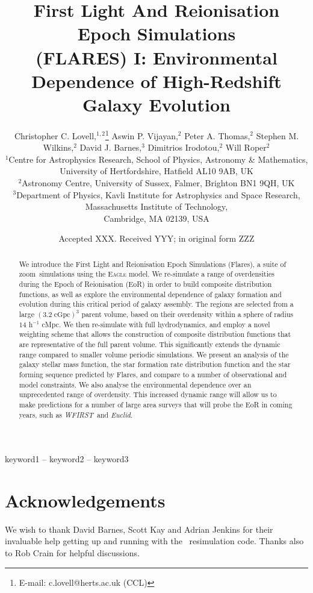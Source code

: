 \documentclass[fleqn,usenatbib]{mnras}
\title[FLARES I]{First Light And Reionisation Epoch Simulations \\(FLARES) I: Environmental Dependence of High-Redshift Galaxy Evolution}
\author[C. C. Lovell et al.]{Christopher C. Lovell,$^{1,2}$\thanks{E-mail: c.lovell@herts.ac.uk (CCL)}
Aswin P. Vijayan,$^{2}$
Peter A. Thomas,$^{2}$
\newauthor
Stephen M. Wilkins,$^{2}$
David J. Barnes,$^{3}$
Dimitrios Irodotou,$^{2}$
Will Roper$^{2}$
\\
$^{1}$Centre for Astrophysics Research, School of Physics, Astronomy \& Mathematics, \\University of Hertfordshire, Hatfield AL10 9AB, UK\\
$^{2}$Astronomy Centre, University of Sussex, Falmer, Brighton BN1 9QH, UK\\
$^{3}$Department of Physics, Kavli Institute for Astrophysics and Space Research, Massachusetts Institute of Technology,\\Cambridge, MA 02139, USA
}
\date{Accepted XXX. Received YYY; in original form ZZZ}
\newcommand{\eagle}{\mbox{\sc{Eagle}}}
\newcommand{\euclid}{\mbox{\it Euclid}}
\newcommand{\flares}{\mbox{\sc Flares}}
\newcommand{\wfirst}{\mbox{\it WFIRST}}
\newcommand{\zoom}{\mbox{zoom}}
\newcommand{\cMpch}{h$^{-1}$ cMpc}
\begin{document}
\label{firstpage}
\pagerange{\pageref{firstpage}--\pageref{lastpage}}
\maketitle

\begin{abstract}
We introduce the First Light and Reionisation Epoch Simulations (\flares), a suite of \zoom\ simulations using the \textsc{Eagle} model.
We re-simulate a range of overdensities during the Epoch of Reionisation (EoR) in order to build composite distribution functions, as well as explore the environmental dependence of galaxy formation and evolution during this critical period of galaxy assembly.
The regions are selected from a large $(3.2 \;\mathrm{cGpc})^{3}$ parent volume, based on their overdensity within a sphere of radius $14$ \cMpch.
We then re-simulate with full hydrodynamics, and employ a novel weighting scheme that allows the construction of composite distribution functions that are representative of the full parent volume.
This significantly extends the dynamic range compared to smaller volume periodic simulations.
We present an analysis of the galaxy stellar mass function, the star formation rate distribution function and the star forming sequence predicted by \flares, and compare to a number of observational and model constraints.
We also analyse the environmental dependence over an unprecedented range of overdensity.
This increased dynamic range will allow us to make predictions for a number of large area surveys that will probe the EoR in coming years, such as \wfirst\ and \euclid.
\end{abstract}

\begin{keywords}
keyword1 -- keyword2 -- keyword3
\end{keywords}






%


\section*{Acknowledgements}
We wish to thank David Barnes, Scott Kay and Adrian Jenkins for their invaluable help getting up and running with the \eagle\ resimulation code.
Thanks also to Rob Crain for helpful discussions.
\end{document}
